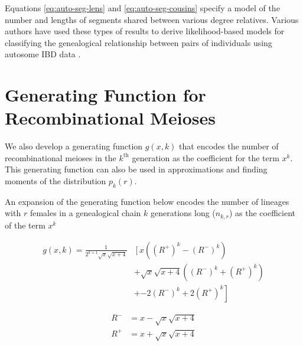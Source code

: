 \documentclass[9pt,twocolumn,twoside]{gsajnl}
\begin{document}
Equations \eqref{eq:auto-seg-lens} and \eqref{eq:auto-seg-cousins} specify a
model of the number and lengths of segments shared between various degree
relatives. Various authors have used these types of results to derive
likelihood-based models for classifying the genealogical relationship between
pairs of individuals using autosome IBD data
\citep{huff2011maximum,Henn:2012ij,Durand010512}. 

\section*{Generating Function for Recombinational Meioses}
\label{ap:generating-function}

We also develop a generating function $g(x, k)$ that encodes the number of
recombinational meioses in the $k^{\text{th}}$ generation as the coefficient
for the term $x^k$. This generating function can also be used in approximations
and finding moments of the distribution $p_k(r)$.

An expansion of the generating function below encodes the number of lineages
with $r$ females in a genealogical chain $k$ generations long ($n_{k,r}$) as
the coefficient of the term $x^{k}$

\begin{align*}
  g(x, k) = \frac{1}{2^{k+1}\sqrt{x} \sqrt{x+4}} &\left[ x \right.
    \left(\left(R^+\right)^k - \left(R^-\right)^k\right)  \nonumber\\
    &+ \sqrt{x} \sqrt{x+4}
    \left(\left(R^-\right)^k + \left(R^+\right)^k\right)  \nonumber\\
    &+ \left. -2 \left(R^-\right)^k+2 \left(R^+\right)^k\right]
\end{align*}


\begin{align*}
    R^- &= x-\sqrt{x} \sqrt{x+4}\\
    R^+ &= x+\sqrt{x} \sqrt{x+4}
\end{align*}
\end{document}
